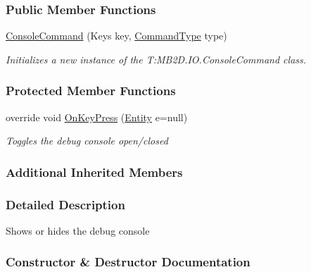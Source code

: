 \subsubsection*{Public Member Functions}
\begin{DoxyCompactItemize}
\item 
\hyperlink{class_m_b2_d_1_1_i_o_1_1_console_command_a20155e6305233ea1655d9475db692b26}{Console\+Command} (Keys key, \hyperlink{namespace_m_b2_d_1_1_i_o_ab5f95f3fe9e652778b62bdf943168a68}{Command\+Type} type)
\begin{DoxyCompactList}\small\item\em Initializes a new instance of the T\+:\+M\+B2\+D.\+I\+O.\+Console\+Command class. \end{DoxyCompactList}\end{DoxyCompactItemize}
\subsubsection*{Protected Member Functions}
\begin{DoxyCompactItemize}
\item 
override void \hyperlink{class_m_b2_d_1_1_i_o_1_1_console_command_ad46e036e534b3b1cd1503782042d358f}{On\+Key\+Press} (\hyperlink{class_m_b2_d_1_1_entity_component_1_1_entity}{Entity} e=null)
\begin{DoxyCompactList}\small\item\em Toggles the debug console open/closed \end{DoxyCompactList}\end{DoxyCompactItemize}
\subsubsection*{Additional Inherited Members}


\subsubsection{Detailed Description}
Shows or hides the debug console 



\subsubsection{Constructor \& Destructor Documentation}
\hypertarget{class_m_b2_d_1_1_i_o_1_1_console_command_a20155e6305233ea1655d9475db692b26}{}\label{class_m_b2_d_1_1_i_o_1_1_console_command_a20155e6305233ea1655d9475db692b26} 
